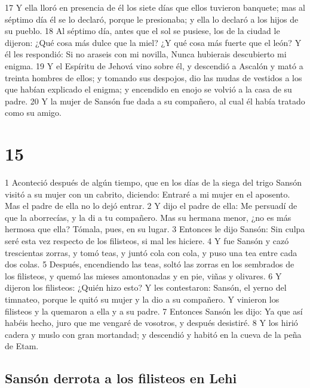17 Y ella lloró en presencia de él los siete días que ellos tuvieron banquete; mas al séptimo día él se lo declaró, porque le presionaba; y ella lo declaró a los hijos de su pueblo.
18 Al séptimo día, antes que el sol se pusiese, los de la ciudad le dijeron:
¿Qué cosa más dulce que la miel?
¿Y qué cosa más fuerte que el león?
Y él les respondió:
Si no araseis con mi novilla,
Nunca hubierais descubierto mi enigma.
19 Y el Espíritu de Jehová vino sobre él, y descendió a Ascalón y mató a treinta hombres de ellos; y tomando sus despojos, dio las mudas de vestidos a los que habían explicado el enigma; y encendido en enojo se volvió a la casa de su padre.
20 Y la mujer de Sansón fue dada a su compañero, al cual él había tratado como su amigo.

\chapter{15}


1 Aconteció después de algún tiempo, que en los días de la siega del trigo Sansón visitó a su mujer con un cabrito, diciendo: Entraré a mi mujer en el aposento. Mas el padre de ella no lo dejó entrar.
2 Y dijo el padre de ella: Me persuadí de que la aborrecías, y la di a tu compañero. Mas su hermana menor, ¿no es más hermosa que ella? Tómala, pues, en su lugar.
3 Entonces le dijo Sansón: Sin culpa seré esta vez respecto de los filisteos, si mal les hiciere.
4 Y fue Sansón y cazó trescientas zorras, y tomó teas, y juntó cola con cola, y puso una tea entre cada dos colas.
5 Después, encendiendo las teas, soltó las zorras en los sembrados de los filisteos, y quemó las mieses amontonadas y en pie, viñas y olivares.
6 Y dijeron los filisteos: ¿Quién hizo esto? Y les contestaron: Sansón, el yerno del timnateo, porque le quitó su mujer y la dio a su compañero. Y vinieron los filisteos y la quemaron a ella y a su padre.
7 Entonces Sansón les dijo: Ya que así habéis hecho, juro que me vengaré de vosotros, y después desistiré.
8 Y los hirió cadera y muslo con gran mortandad; y descendió y habitó en la cueva de la peña de Etam.
\section*{Sansón derrota a los filisteos en Lehi}


